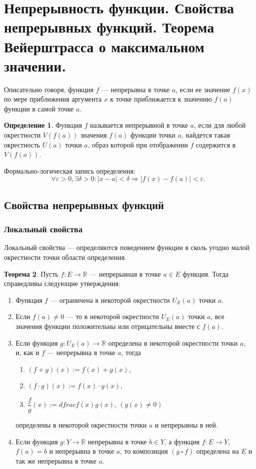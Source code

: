 \documentclass[12pt]{report}
\theoremstyle{definition}
\newtheorem{theorem}{Теорема}[chapter]
\newtheorem{definition}[theorem]{Определение}
\newcommand{\R}{\mathbb R}
\begin{document}
\section{Непрерывность функции. Свойства непрерывных функций. Теорема Вейерштрасса о максимальном значении.}

Описательно говоря, функция $f$ --- непрерывна в точке $a$, если ее значение $f(x)$ по мере приближения
аргумента $x$ к точке приближается к значению $f(a)$ функции в самой точке $a$.

\begin{definition}
Функция $f$ называется непрерывной в точке $a$, если для любой
окрестности $V(f(a))$ значения $f(a)$ функции точки $a$, найдется такая
окрестность $U(a)$ точки $a$, образ которой при отображении $f$ содержится
в $V(f(a))$.
\end{definition}

Формально-логическая запись определения:
$$
\forall \varepsilon > 0, \exists \delta > 0:
|x - a| < \delta \Rightarrow |f(x) - f(a)| < \varepsilon.
$$


\subsection{Свойства непрерывных функций}
\subsubsection{Локальный свойства}
Локальный свойства --- определяются поведением функции в сколь угодно
малой окрестности точки области определения.

\begin{theorem}
Пусть $f: E \rightarrow \R$ --- непрерывная в точке $a \in E$ функция.
Тогда справедливы следующие утверждения:
\begin{enumerate}
  \item Функция $f$ --- ограничена в некоторой окрестности $U_E(a)$ точки $a$.
  \item Если $f(a) \ne 0$ --- то в некоторой окрестности $U_E(a)$ точки $a$,
    все значения функции положительны или отрицательны вместе с $f(a)$.
  \item Если функция $g: U_E(a) \rightarrow \R$ определена в некоторой окрестности
    точки $a$, и, как и $f$ --- непрерывна в точке $a$, тогда
    \begin{enumerate}
      \item $(f + g)(x) := f(x) + g(x)$,
      \item $(f \cdot g)(x) := f(x) \cdot g(x)$,
      \item $\dfrac{f}{g}(x) := dfrac{f(x)}{g(x)}$, $(g(x) \ne 0)$
    \end{enumerate}
    определены в некоторой окрестности точки $a$ и непрерывны в ней.
  \item Если функция $g: Y \rightarrow \R$ непрерывна в точке $b \in Y$,
    а функция $f: E \rightarrow Y$, $f(a) = b$ и непрерывна в точке $a$,
    то композиция $(g \circ f)$ определена на $E$ и так же непрерывна в точке $a$.
\end{enumerate}
\end{theorem}
\end{document}
